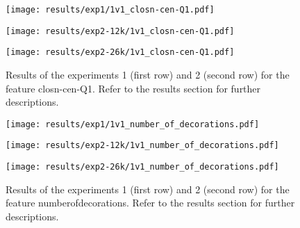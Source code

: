 \begin{figure}[h!]
	\centering
	\begin{minipage}{0.4\linewidth}
		\texttt{[image: results/exp1/1v1\_closn-cen-Q1.pdf]}
	\end{minipage}
	
	\begin{minipage}{0.4\linewidth}
		\texttt{[image: results/exp2-12k/1v1\_closn-cen-Q1.pdf]}
	\end{minipage}
	\begin{minipage}{0.4\linewidth}
		\texttt{[image: results/exp2-26k/1v1\_closn-cen-Q1.pdf]}
	\end{minipage}
	
	\caption[ Results: Feature closn-cen-Q1]{ Results of the experiments 1 (first row) and 2 (second row) for the feature closn-cen-Q1. Refer to the results section for further descriptions. }
	\label{fig:appendix_closn-cen-Q1}
\end{figure}
\newpage 


\begin{figure}[h!]
	\centering
	\begin{minipage}{0.4\linewidth}
		\texttt{[image: results/exp1/1v1\_number\_of\_decorations.pdf]}
	\end{minipage}
	
	\begin{minipage}{0.4\linewidth}
		\texttt{[image: results/exp2-12k/1v1\_number\_of\_decorations.pdf]}
	\end{minipage}
	\begin{minipage}{0.4\linewidth}
		\texttt{[image: results/exp2-26k/1v1\_number\_of\_decorations.pdf]}
	\end{minipage}
	
	\caption[ Results: Feature number\textunderscore of\textunderscore decorations]{ Results of the experiments 1 (first row) and 2 (second row) for the feature number\textunderscore of\textunderscore decorations. Refer to the results section for further descriptions. }
	\label{fig:appendix_number_of_decorations}
\end{figure}

